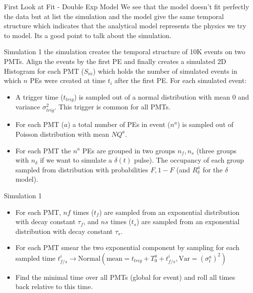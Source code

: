 \documentclass{beamer}
\begin{document}
\begin{frame}{First Look at Fit - Double Exp Model}
We see that the model doesn't fit perfectly the data but at list the simulation and the model give the same temporal structure which indicates that the analytical model represents the physics we try to model. Its a good point to talk about the simulation.
\end{frame}

\begin{frame}{Simulation 1}
the simulation creates the temporal structure of 10K events on two PMTs. Align the events by the first PE and finally creates a simulated 2D Histogram for each PMT ($S_{ni}$) which holds the number of simulated events in which $n$ PEs were created at time $t_i$ after the first PE. 
For each simulated event:
\begin{itemize}
\item A trigger time ($t_{trig}$) is sampled out of a normal distribution with mean 0 and variance $\sigma_{trig}^2$. This trigger is common for all PMTs.
\item For each PMT ($a$) a total number of PEs in event ($n^a$) is sampled out of Poisson distribution with mean $NQ^a$.
\item For each PMT the $n^a$ PEs are grouped in two groups $n_f, n_s$ (three groups with $n_\delta$ if we want to simulate a $\delta(t)$ pulse). The occupancy of each group sampled from distribution with probabilities $F, 1-F$ (and $R_\delta^a$ for the $\delta$ model). 
\end{itemize}
\end{frame}

\begin{frame}{Simulation 1}
\begin{itemize}
\item For each PMT, $nf$ times ($t_f$) are sampled from an exponential distribution with decay constant $\tau_f$, and $ns$ times ($t_s$) are sampled from an exponential distribution with decay constant $\tau_s$.
\item For each PMT smear the two exponential component by sampling for each sampled time $t_{f/s}^i\rightarrow \text{Normal}(\text{mean}=t_{trig}+T_0^a+t_{f/s}^i, \text{Var}=(\sigma_t^a)^2)$
\item Find the minimal time over all PMTs (global for event) and roll all times back relative to this time.
\end{itemize}
\end{frame}
\end{document}
